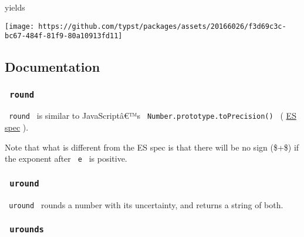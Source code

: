 yields

\texttt{[image: https://github.com/typst/packages/assets/20166026/f3d69c3c-bc67-484f-81f9-80a10913fd11]}

\subsection{Documentation}\label{documentation}

\subsubsection{\texorpdfstring{\texttt{\ round\ }}{ round }}\label{round}

\texttt{\ round\ } is similar to JavaScriptâ€™s
\texttt{\ Number.prototype.toPrecision()\ } (
\href{https://tc39.es/ecma262/multipage/numbers-and-dates.html\#sec-number.prototype.toprecision}{ES
spec} ).

\begin{Shaded}
\begin{Highlighting}[]
\end{Highlighting}
\end{Shaded}

Note that what is different from the ES spec is that there will be no
sign (\$+\$) if the exponent after \texttt{\ e\ } is positive.

\subsubsection{\texorpdfstring{\texttt{\ uround\ }}{ uround }}\label{uround}

\texttt{\ uround\ } rounds a number with its uncertainty, and returns a
string of both.

\begin{Shaded}
\begin{Highlighting}[]
\end{Highlighting}
\end{Shaded}

\subsubsection{\texorpdfstring{\texttt{\ urounds\ }}{ urounds }}\label{urounds}

